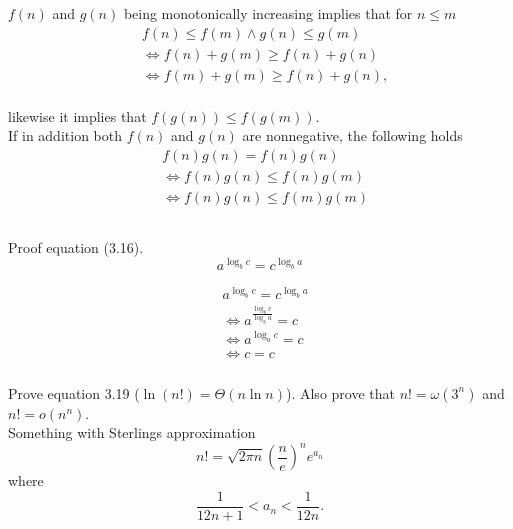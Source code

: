 \documentclass[11pt]{article}
\numberwithin{equation}{section}
\renewcommand{\iff}{\Leftrightarrow}
\begin{document}
$f(n)$ and $g(n)$ being monotonically increasing implies that for $n \leq m$ 
\begin{equation*}
    \begin{split}
        & f(n) \leq f(m) \land g(n) \leq g(m)\\
        & \iff f(n) + g(m) \geq f(n) + g(n)\\
        & \iff f(m) + g(m) \geq f(n) + g(n),\\
    \end{split}
\end{equation*}

likewise it implies that $f(g(n)) \leq f(g(m))$.\\
If in addition both $f(n)$ and $g(n)$ are nonnegative, 
the following holds
\begin{equation*}
    \begin{split}
        & f(n)g(n) = f(n)g(n)\\
        & \iff f(n)g(n) \leq f(n)g(m)\\
        & \iff f(n)g(n) \leq f(m)g(m)\\
    \end{split}
\end{equation*}

\subsubsection{}
Proof equation (3.16).
\begin{equation}\tag{3.16}
    a^{\log_b c} = c^{\log_b a}
\end{equation}

\[
    \begin{split}
        & a^{\log_b c} = c^{\log_b a}             \\
        & \iff a^{\frac{\log_b c}{ \log_b a}} = c \\
        & \iff a^{\log_a c} = c                   \\
        & \iff c = c
    \end{split}
\]

\subsubsection{}
Prove equation 3.19 ($\ln(n!) = \Theta(n \ln n)$). Also prove that
$n! = \omega(3^n)$ and $n! = o(n^n)$.\\

Something with Sterlings approximation
\[
    n! = \sqrt{2 \pi n}{\left(\frac{n}{e}\right)}^n e^{a_n}
\]
where 
\[
    \frac{1}{12n+1} < a_n < \frac{1}{12n}.
\]
\end{document}
